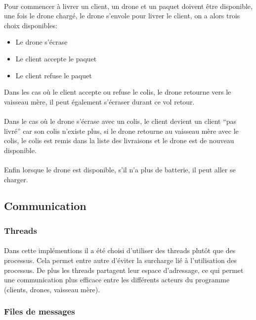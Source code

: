 \documentclass[article, backcover, french, nodocumentinfo]{upmethodology-document}
\begin{document}
			\paragraph*{}
				Pour commencer à livrer un client, un drone et un paquet doivent être disponible, une fois le drone chargé, le drone s'envole pour livrer le client, on a alors trois choix disponibles:
				\begin{itemize}
					\item Le drone s'écrase
					\item Le client accepte le paquet
					\item Le client refuse le paquet
				\end{itemize}
				Dans les cas où le client accepte ou refuse le colis, le drone retourne vers le vaisseau mère, il peut également s'écraser	durant ce vol retour.
			\paragraph*{}
				Dans le cas où le drone s'écrase avec un colis, le client devient un client ``pas livré'' car son colis n'existe plus, si le drone retourne au vaisseau mère avec le colis, le colis est remis dans la liste des livraisons et le drone est de nouveau disponible.
			\paragraph*{}
				Enfin lorsque le drone est disponible, s'il n'a plus de batterie, il peut aller se charger.
		\subsection{Communication}
			\subsubsection{Threads}
				\paragraph*{}
					Dans cette implémentions il a été choisi d'utiliser des threads plutôt que des processus. Cela permet entre autre d'éviter la surcharge lié à l'utilisation des processus. De plus les threads partagent leur espace d'adressage, ce qui permet une communication plus efficace entre les différents acteurs du programme (clients, drones, vaisseau mère).
			\subsubsection{Files de messages}
\end{document}
